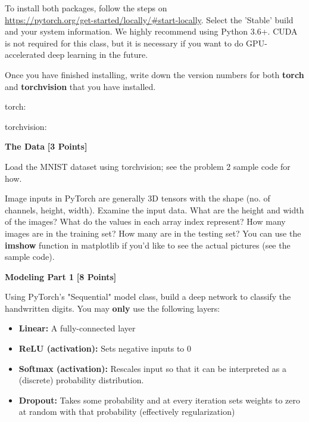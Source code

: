 To install both packages, follow the steps on \\
\url{https://pytorch.org/get-started/locally/#start-locally}. Select the 'Stable' build and your system information. We highly recommend using Python 3.6+. CUDA is not required for this class, but it is necessary if you want to do GPU-accelerated deep learning in the future.

Once you have finished installing, write down the version numbers for both \textbf{torch} and \textbf{torchvision} that you have installed.

\begin{solution}

torch:

torchvision:

\end{solution}

\newpage



\problem \textbf{The Data} \textbf{[3 Points]}

Load the MNIST dataset using torchvision; see the problem 2 sample code for how.

Image inputs in PyTorch are generally 3D tensors with the shape (no. of channels, height, width). Examine the input data. What are the height and width of the images? What do the values in each array index represent?  How many images are in the training set? How many are in the testing set? You can use the \textbf{imshow} function in matplotlib if you'd like to see the actual pictures (see the sample code).

\begin{subsolution}

\end{subsolution}

\newpage



 \problem \textbf{Modeling Part 1} \textbf{[8 Points]}

 Using PyTorch's "Sequential" model class, build a deep network to classify the handwritten digits. You may \textbf{only} use the following layers:

 \begin{itemize}
  \item \textbf{Linear:} A fully-connected layer
  \item \textbf{ReLU (activation):} Sets negative inputs to 0
  \item \textbf{Softmax (activation):} Rescales input so that it can be interpreted as a (discrete) probability distribution.
  \item \textbf{Dropout:} Takes some probability and at every iteration sets weights to zero at random with that probability (effectively regularization)
\end{itemize}

